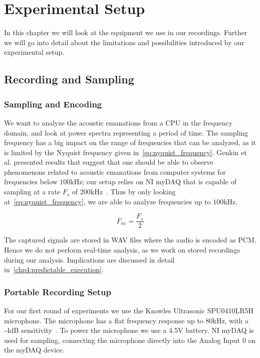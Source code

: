 \chapter{Experimental Setup}
\label{chp:experimental_setup}
In this chapter we will look at the equipment we use in our recordings.
Further we will go into detail about the limitations and possibilities introduced by our experimental setup.


\section{Recording and Sampling}\label{chp3:sec:microphone_selection}

\subsection{Sampling and Encoding}
We want to analyze the acoustic emanations from a \gls{CPU} in the frequency domain, and look at power spectra representing a period of time.
The sampling frequency has a big impact on the range of frequencies that can be analyzed, as it is limited by the Nyquist frequency given in~\autoref{eq:nyquist_frequency}.
Genkin et al. presented results that suggest that one should be able to observe phenomenons related to acoustic emanations from computer systems for frequencies below \(100\)kHz; our setup relies on \gls{NI} myDAQ that is capable of sampling at a rate \({F_{s}}\) of \(200\)kHz~\footnotemark.
Thus by only looking at~\autoref{eq:nyquist_frequency}, we are able to analyze frequencies up to \(100\)kHz.



\begin{equation}\label{eq:nyquist_frequency}
F_{nc} = \frac{F_{s}}{2}
\end{equation}

The captured signals are stored in \gls{WAV} files where the audio is encoded as \gls{PCM}.
Hence we do not perform real-time analysis, as we work on stored recordings during our analysis.
Implications are discussed in detail in~\autoref{chp4:predictable_execution}.


\subsection{Portable Recording Setup}\label{chp3:sec:knowles_configuration}
For our first round of experiments we use the Knowles Ultrasonic SPU0410LR5H microphone.
The microphone has a flat frequency response up to 80kHz, with a -4dB sensitivity~\cite{url:knowles_spec}.
To power the microphone we use a 4.5V battery.
\gls{NI} myDAQ is used for sampling, connecting the microphone directly into the Analog Input 0 on the myDAQ device.


